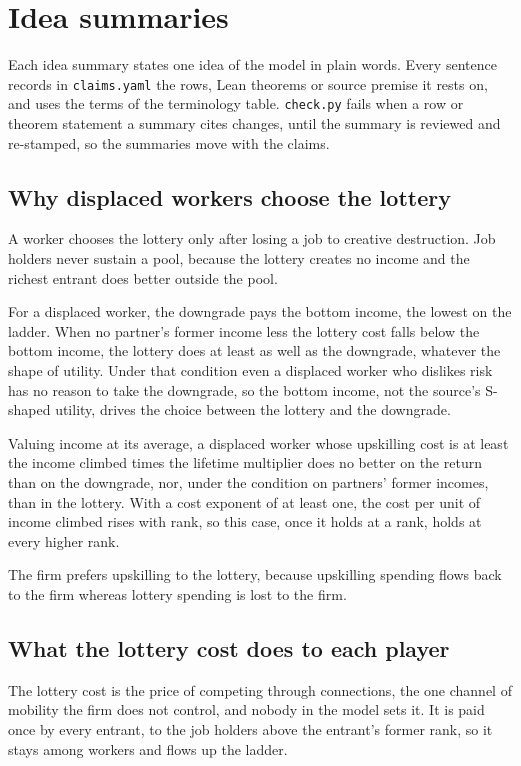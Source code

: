 \documentclass[10pt]{article}
\begin{document}
\section{Idea summaries}
Each idea summary states one idea of the model in plain words. Every sentence records in \texttt{claims.yaml} the rows, Lean theorems or source premise it rests on, and uses the terms of the terminology table. \texttt{check.py} fails when a row or theorem statement a summary cites changes, until the summary is reviewed and re-stamped, so the summaries move with the claims.

\subsection{Why displaced workers choose the lottery}
A worker chooses the lottery only after losing a job to creative destruction. Job holders never sustain a pool, because the lottery creates no income and the richest entrant does better outside the pool.

For a displaced worker, the downgrade pays the bottom income, the lowest on the ladder. When no partner's former income less the lottery cost falls below the bottom income, the lottery does at least as well as the downgrade, whatever the shape of utility. Under that condition even a displaced worker who dislikes risk has no reason to take the downgrade, so the bottom income, not the source's S-shaped utility, drives the choice between the lottery and the downgrade.

Valuing income at its average, a displaced worker whose upskilling cost is at least the income climbed times the lifetime multiplier does no better on the return than on the downgrade, nor, under the condition on partners' former incomes, than in the lottery. With a cost exponent of at least one, the cost per unit of income climbed rises with rank, so this case, once it holds at a rank, holds at every higher rank.

The firm prefers upskilling to the lottery, because upskilling spending flows back to the firm whereas lottery spending is lost to the firm.

\subsection{What the lottery cost does to each player}
The lottery cost is the price of competing through connections, the one channel of mobility the firm does not control, and nobody in the model sets it. It is paid once by every entrant, to the job holders above the entrant's former rank, so it stays among workers and flows up the ladder.
\end{document}
